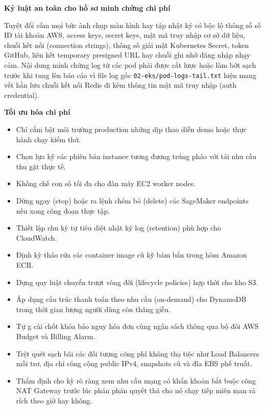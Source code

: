 \vspace{0.5em}\noindent\textbf{Kỷ luật an toàn cho hồ sơ minh chứng chi
phí}\par

Tuyệt đối cấm mọi bức ảnh chụp màn hình hay tập nhật ký có bộc lộ thông
số số ID tài khoản AWS, access keys, secret keys, mật mã truy nhập cơ sở
dữ liệu, chuỗi kết nối (connection strings), thông số giải mật
Kubernetes Secret, token GitHub, liên kết temporary presigned URL hay
chuỗi ghi nhớ đăng nhập nhạy cảm. Nội dung minh chứng log từ các pod
phải được cắt lược hoặc làm bớt sạch trước khi tung lên báo cáo vì file
log gốc \texttt{02-\allowbreak{}eks/\allowbreak{}pod-\allowbreak{}logs-\allowbreak{}tail.\allowbreak{}txt} hiện mang vết hằn lưu chuỗi
kết nối Redis đi kèm thông tin mật mã truy nhập (auth credential).

\vspace{0.5em}\noindent\textbf{Tối ưu hóa chi
phí}\par

\begin{itemize}
\tightlist
\item
  Chỉ cắm bật môi trường production những dịp thao diễn demo hoặc thực
  hành chạy kiểm thử.
\item
  Chọn lựa kỹ các phiên bản instance tương đương trúng pháo với tải nhu
  cầu thu gặt thực tế.
\item
  Khống chế con số tối đa cho đàn máy EC2 worker nodes.
\item
  Dừng ngay (stop) hoặc ra lệnh chém bỏ (delete) các SageMaker endpoints
  nếu xong công đoạn thực tập.
\item
  Thiết lập chu kỳ tự tiêu diệt nhật ký log (retention) phù hợp cho
  CloudWatch.
\item
  Định kỳ tháo rửa các container image cũ kỹ bám bẩn trong hòm Amazon
  ECR.
\item
  Dựng quy luật chuyển trượt vòng đời (lifecycle policies) hợp thời cho
  kho S3.
\item
  Áp dụng cấu trúc thanh toán theo nhu cầu (on-demand) cho DynamoDB
  trong thời gian lượng người dùng còn thăng giễu.
\item
  Tự g cài chốt khóa báo nguy hóa đơn cùng ngân sách thông qua bộ đôi
  AWS Budget và Billing Alarm.
\item
  Trệt quét sạch bãi các đối tượng cõng phí không thọ tiệc như Load
  Balancers mồi trơ, địa chỉ công cộng public IPv4, snapshots cũ và đĩa
  EBS phế truất.
\item
  Thẩm định cho kỳ rõ ràng xem nhu cầu mạng có khẩn khoản bắt buộc cõng
  NAT Gateway trước lúc phán phán quyết thả cho nó chạy tiếp miên man rả
  rích theo giờ hay không.
\end{itemize}

